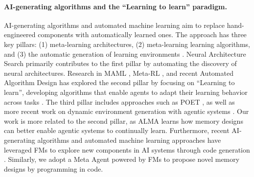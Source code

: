 \documentclass{article}
\theoremstyle{plain}
\theoremstyle{definition}
\theoremstyle{remark}
\newcommand{\ouralgo}{ALMA\xspace} %
\newif\ifcomment
\newcommand{\shout}[1]{\textcolor{violet}{\ifcomment SH: \sout{#1}\else\fi}}
\newcommand{\shc}[1]{\textcolor{violet}{\ifcomment(SH Comment: #1)\else#1\fi}}
\begin{document}
\paragraph{AI-generating algorithms and the ``Learning to learn'' paradigm.}
AI-generating algorithms \citep{clune2019ai} and automated machine learning \citep{hutter2019automated} aim to replace hand-engineered components with automatically learned ones. The approach has three key pillars: (1) meta-learning architectures, (2) meta-learning learning algorithms, and (3) the automatic generation of learning environments \citep{clune2019ai}.
Neural Architecture Search \citep{Thomas2019Neural, Lu2019NSGA, hu2023accelerating} primarily contributes to the first pillar by automating the discovery of neural architectures. Research in MAML \citep{Finn2017Agnostic}, Meta-RL \citep{wang2016learning, duan2016rl, Ben2024First}, and recent Automated Algorithm Design \citep{Liu2024EoH,liu2025systematic} has explored the second pillar by focusing on ``Learning to learn'', developing algorithms that enable agents to adapt their learning behavior across tasks \citep{Beaulieu2020Learning,Lu2024Discovering}. 
The third pillar includes approaches such as POET \citep{Rui2019POET, Rui2024EnhancedPOET}, as well as more recent work on dynamic environment generation with agentic systems \citep{Fuma2024LLM, guo2025genenv,Zhang2024OMNI}.
Our work is more related to the second pillar, as \ouralgo learns how memory designs can better enable agentic systems to continually learn. Furthermore, recent AI-generating algorithms and automated machine learning approaches have leveraged FMs to explore new components in AI systems through code generation \citep{hu2024ADAS, zhang2025darwin, Faldor2025OMNI, yamada2025ai,lu2024ai, Lu2024Discovering,lu2025automated, Lehman2024}. 
Similarly, we adopt a Meta Agent powered by FMs to propose novel memory designs by programming in code.

\end{document}
